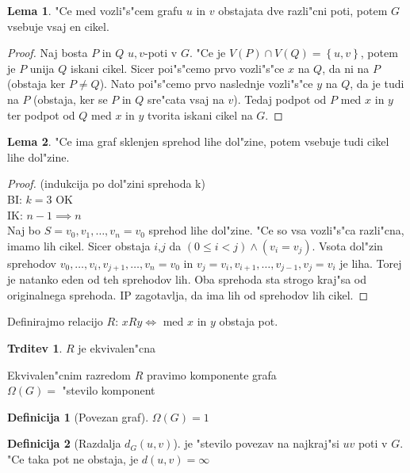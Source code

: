 \documentclass{article}
\theoremstyle{definition}
\newtheorem{definition}{Definicija}[section]
\newtheorem{lemma}{Lema}[section]
\newtheorem{claim}{Trditev}[section]
\begin{document}
	\begin{lemma}
		"Ce med vozli"s"cem grafu $u$ in $v$ obstajata dve razli"cni poti, potem $G$ vsebuje vsaj en cikel.
		\begin{proof}
			Naj bosta $P$ in $Q$ $u,v$-poti v $G$. "Ce je $V(P) \cap V(Q) = \left\lbrace u,v\right\rbrace$, potem je $P$ unija $Q$ iskani cikel. Sicer poi"s"cemo prvo vozli"s"ce $x$ na $Q$, da ni na $P$ (obstaja ker $P \neq Q$). Nato poi"s"cemo prvo naslednje vozli"s"ce $y$ na $Q$, da je tudi na $P$ (obstaja, ker se $P$ in $Q$ sre"cata vsaj na $v$). Tedaj podpot od $P$ med $x$ in $y$ ter podpot od $Q$ med $x$ in $y$ tvorita iskani cikel na $G$.
		\end{proof}
	\end{lemma}
	
	\begin{lemma}\label{lem:1}
		"Ce ima graf sklenjen sprehod lihe dol"zine, potem vsebuje tudi cikel lihe dol"zine.
		\begin{proof}
			(indukcija po dol"zini sprehoda k)\\
			BI: $k=3$ OK \\ 
			IK: $n-1 \implies n$ \\ 
			Naj bo $S=v_0,v_1,\ldots,v_n=v_0$ sprehod lihe dol"zine. "Ce so vsa vozli"s"ca razli"cna, imamo lih cikel. Sicer obstaja $i$,$j$ da $(0 \leq i < j) \land (v_i = v_j)$. Vsota dol"zin sprehodov $v_0, \ldots, v_i, v_{j+1}, \ldots, v_n = v_0$ in $v_j = v_i, v_{i+1},\ldots,v_{j-1},v_j=v_i$ je liha. Torej je natanko eden od teh sprehodov lih. Oba sprehoda sta strogo kraj"sa od originalnega sprehoda. IP zagotavlja, da ima lih od sprehodov lih cikel.
		\end{proof}
	\end{lemma}

	
	Definirajmo relacijo $R$: $xRy \iff$ med $x$ in $y$ obstaja pot.
	\begin{claim}
		$R$ je ekvivalen"cna
	\end{claim}
	Ekvivalen"cnim razredom $R$ pravimo komponente grafa \\ 
	$\Omega(G) =$ "stevilo komponent \\ 
	\begin{definition}[Povezan graf]
		$\Omega(G) = 1$
	\end{definition}
	\begin{definition}[Razdalja $d_G(u,v)$]
		je "stevilo povezav na najkraj"si $uv$ poti v $G$. "Ce taka pot ne obstaja, je $d(u,v) = \infty$
	\end{definition}
	
\end{document}
